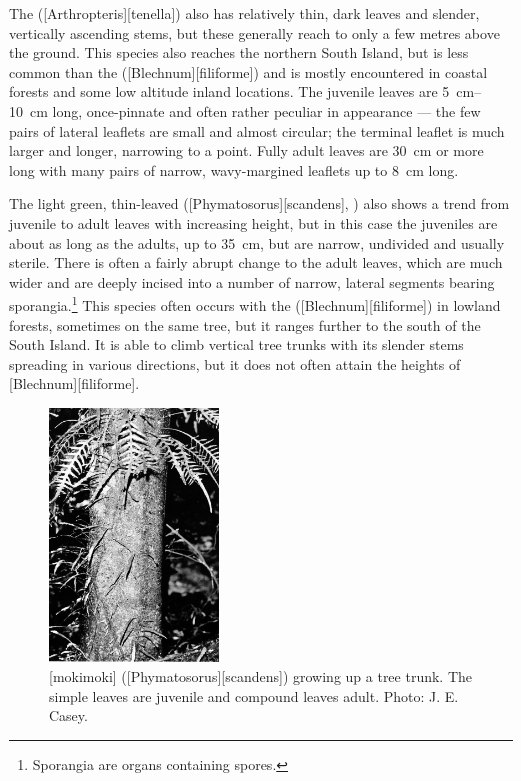 The  ([Arthropteris][tenella]) also has relatively thin, dark leaves and slender, vertically ascending stems, but these generally reach to only a few metres above the ground.
This species also reaches the northern South Island, but is less common than the  ([Blechnum][filiforme]) and is mostly encountered in coastal forests and some low altitude inland locations.
The juvenile leaves are \SIrange{5}{10}{\centi\metre} long, once-pinnate and often rather peculiar in appearance --- the few pairs of lateral leaflets are small and almost circular; the terminal leaflet is much larger and longer, narrowing to a point.
Fully adult leaves are \SI{30}{\centi\metre} or more long with many pairs of narrow, wavy-margined leaflets up to \SI{8}{\centi\metre} long.

The light green, thin-leaved  ([Phymatosorus][scandens], ) also shows a trend from juvenile to adult leaves with increasing height, but in this case the juveniles are about as long as the adults, up to \SI{35}{\centi\metre}, but are narrow, undivided and usually sterile.
There is often a fairly abrupt change to the adult leaves, which are much wider and are deeply incised into a number of narrow, lateral segments bearing sporangia.\footnote{Sporangia are organs containing spores.}
This species often occurs with the  ([Blechnum][filiforme]) in lowland forests, sometimes on the same tree, but it ranges further to the south of the South Island.
It is able to climb vertical tree trunks with its slender stems spreading in various directions, but it does not often attain the heights of [Blechnum][filiforme].

\begin{figure}
	\includegraphics[width=0.4\textwidth]{graphics/figure29scandens.jpg}
	\centering
	\caption[Mokimoki (\emph{Phymatosorus scandens}) growing up a tree trunk]{[mokimoki] ([Phymatosorus][scandens]) growing up a tree trunk.
The simple leaves are juvenile and compound leaves adult.
	Photo: J. E. Casey.}%
	\label{fig:29scandens}
\end{figure}

